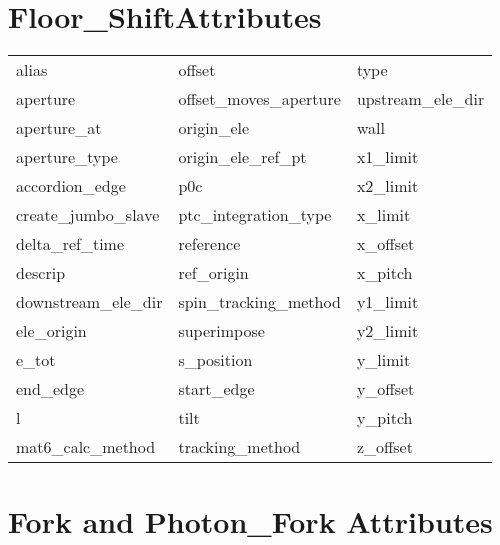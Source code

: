  \section{Floor_ShiftAttributes}
 \label{s:list.floor.shift}
 
 \begin{tabular}{lll} \toprule
alias                       & offset                      & type                        \\
aperture                    & offset_moves_aperture       & upstream_ele_dir            \\
aperture_at                 & origin_ele                  & wall                        \\
aperture_type               & origin_ele_ref_pt           & x1_limit                    \\
accordion_edge              & p0c                         & x2_limit                    \\
create_jumbo_slave          & ptc_integration_type        & x_limit                     \\
delta_ref_time              & reference                   & x_offset                    \\
descrip                     & ref_origin                  & x_pitch                     \\
downstream_ele_dir          & spin_tracking_method        & y1_limit                    \\
ele_origin                  & superimpose                 & y2_limit                    \\
e_tot                       & s_position                  & y_limit                     \\
end_edge                    & start_edge                  & y_offset                    \\
l                           & tilt                        & y_pitch                     \\
mat6_calc_method            & tracking_method             & z_offset                    \\
 \bottomrule
 \end{tabular}
 \vfill
 
 \section{Fork and Photon_Fork Attributes}
 \label{s:list.fork}
 
